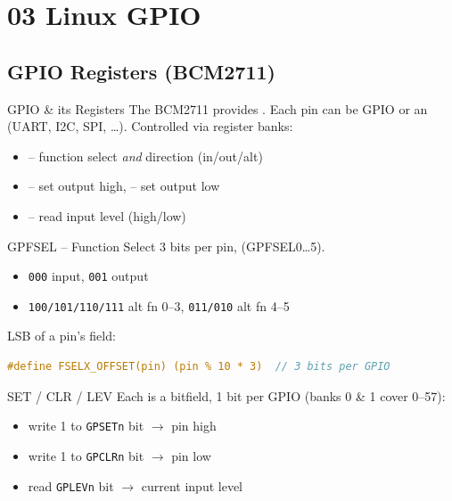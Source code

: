 \section{03 Linux GPIO}

\subsection{GPIO Registers (BCM2711)}


\begin{concept}{GPIO \& its Registers}
    The BCM2711 provides . Each pin can be GPIO or an
     (UART, I2C, SPI, \dots). Controlled via register banks:
    \begin{itemize}
        \item {} -- function select \emph{and} direction (in/out/alt)
        \item {} -- set output high,  -- set output low
        \item {} -- read input level (high/low)
    \end{itemize}
\end{concept}

\begin{definition}{GPFSEL -- Function Select}
    3 bits per pin,  (GPFSEL0\dots5).
    \begin{itemize}
        \item \texttt{000} input, \texttt{001} output
        \item \texttt{100/101/110/111} alt fn 0--3, \texttt{011/010} alt fn 4--5
    \end{itemize}
    LSB of a pin's field:
\begin{lstlisting}[language=C, style=basesmol, aboveskip=2pt, belowskip=2pt]
#define FSELX_OFFSET(pin) (pin % 10 * 3)  // 3 bits per GPIO
\end{lstlisting}
\end{definition}


\begin{definition}{SET / CLR / LEV}
    Each is a bitfield, 1 bit per GPIO (banks 0 \& 1 cover 0--57):
    \begin{itemize}
        \item write 1 to \texttt{GPSETn} bit $\to$ pin high
        \item write 1 to \texttt{GPCLRn} bit $\to$ pin low
        \item read \texttt{GPLEVn} bit $\to$ current input level
    \end{itemize}
\end{definition}

